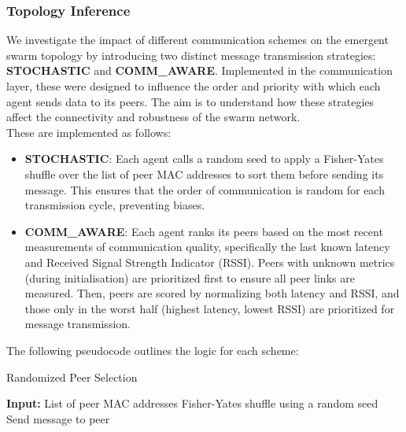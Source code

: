 \documentclass[conference]{IEEEtran}
\begin{document}

\subsubsection{Topology Inference}\label{sec:topology-inference}


We investigate the impact of different communication schemes on the emergent swarm topology by introducing two distinct message transmission strategies: \textbf{STOCHASTIC} and \textbf{COMM\_AWARE}. Implemented in the communication layer, these were designed to influence the order and priority with which each agent sends data to its peers. The aim is to understand how these strategies affect the connectivity and robustness of the swarm network.\\

These are implemented as follows:

\begin{itemize}
    \item \textbf{STOCHASTIC}: Each agent calls a random seed to apply a Fisher-Yates shuffle over the list of peer MAC addresses to sort them before sending its message. This ensures that the order of communication is random for each transmission cycle, preventing biases.
    \item \textbf{COMM\_AWARE}: Each agent ranks its peers based on the most recent measurements of communication quality, specifically the last known latency and Received Signal Strength Indicator (RSSI). Peers with unknown metrics (during initialisation) are prioritized first to ensure all peer links are measured. Then, peers are scored by normalizing both latency and RSSI, and those only in the worst half (highest latency, lowest RSSI) are prioritized for message transmission.
\end{itemize}

The following pseudocode outlines the logic for each scheme:

\begin{algorithm}[H]
\caption{Randomized Peer Selection}
\begin{algorithmic}[1]
\State \textbf{Input:} List of peer MAC addresses
\State Fisher-Yates shuffle using a random seed
        \State Send message to peer
    \EndIf
\EndFor
\end{algorithmic}
\end{algorithm}
\end{document}
